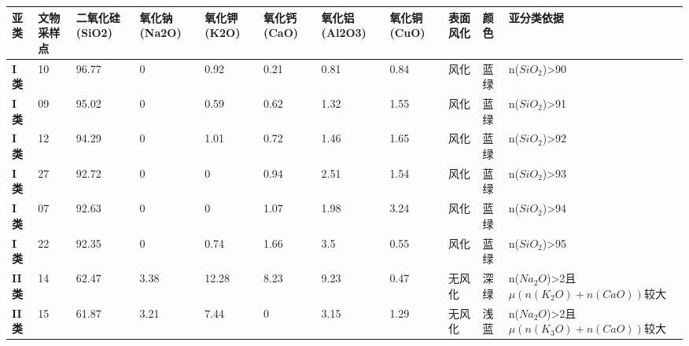 \documentclass[withoutpreface,bwprint]{cumcmthesis} %
\begin{document}
\begin{appendices}
\begin{table}[!h]
	\centering
	\tiny
	\begin{tabular}{@{}lllllllllll@{}}
		\toprule
		\textbf{亚类}   & \textbf{文物采样点} & \textbf{二氧化硅(SiO2)} & \textbf{氧化钠(Na2O)} & \textbf{氧化钾(K2O)} & \textbf{氧化钙(CaO)} & \textbf{氧化铝(Al2O3)} & \textbf{氧化铜(CuO)} & \textbf{表面风化} & \textbf{颜色} & \textbf{亚分类依据}                         \\ \midrule
		\textbf{I类}   & 10             & 96.77               & 0                  & 0.92              & 0.21              & 0.81                & 0.84              & 风化            & 蓝绿          & n($SiO_2$)>90                          \\
		\textbf{I类}   & 09             & 95.02               & 0                  & 0.59              & 0.62              & 1.32                & 1.55              & 风化            & 蓝绿          & n($SiO_2$)>91                          \\
		\textbf{I类}   & 12             & 94.29               & 0                  & 1.01              & 0.72              & 1.46                & 1.65              & 风化            & 蓝绿          & n($SiO_2$)>92                          \\
		\textbf{I类}   & 27             & 92.72               & 0                  & 0                 & 0.94              & 2.51                & 1.54              & 风化            & 蓝绿          & n($SiO_2$)>93                          \\
		\textbf{I类}   & 07             & 92.63               & 0                  & 0                 & 1.07              & 1.98                & 3.24              & 风化            & 蓝绿          & n($SiO_2$)>94                          \\
		\textbf{I类}   & 22             & 92.35               & 0                  & 0.74              & 1.66              & 3.5                 & 0.55              & 风化            & 蓝绿          & n($SiO_2$)>95                          \\
		\textbf{II类}  & 14             & 62.47               & 3.38               & 12.28             & 8.23              & 9.23                & 0.47              & 无风化           & 深绿          & n($Na_2O$)>2且$\mu (n(K_2O)+n(CaO))$较大  \\
		\textbf{II类}  & 15             & 61.87               & 3.21               & 7.44              & 0                 & 3.15                & 1.29              & 无风化           & 浅蓝          & n($Na_2O$)>2且$\mu (n(K_3O)+n(CaO))$较大  \\

\end{tabular}
\end{table}
\end{appendices}
\end{document}
